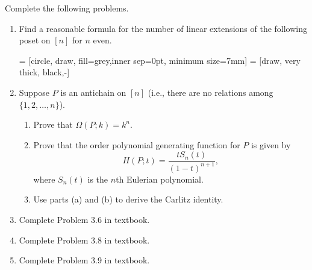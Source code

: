 \documentclass[11pt]{article}%
\theoremstyle{definition}
\begin{document}
Complete the following problems. 
\begin{enumerate}
\item Find a reasonable formula for the number of linear extensions of the following poset on $[n]$ for $n$ even.

 = [circle, draw, fill=grey,inner sep=0pt, minimum size=7mm]
 = [draw, very thick, black,-]

\begin{center}
\end{center}

\item Suppose $P$ is an antichain on $[n]$ (i.e., there are no relations among $\{1,2,\ldots,n\}$).
\begin{enumerate}
\item Prove that $\Omega(P;k)=k^n$.
\item Prove that the order polynomial generating function for $P$ is given by
\[
H(P;t)=\frac{tS_n(t)}{(1-t)^{n+1}},
\]
where $S_n(t)$ is the $n$th Eulerian polynomial.
\item Use parts (a) and (b) to derive the Carlitz identity.
\end{enumerate}
\item Complete Problem 3.6 in textbook.
\item Complete Problem 3.8 in textbook.
\item Complete Problem 3.9 in textbook.
\end{enumerate}
\end{document}
